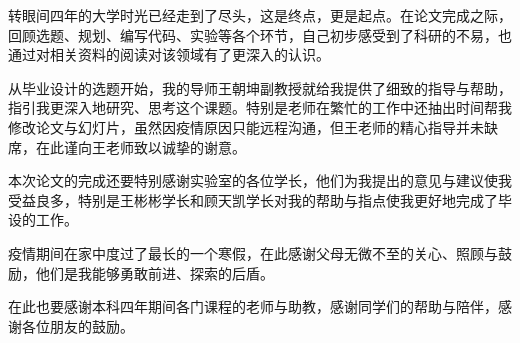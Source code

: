 
\begin{acknowledgements}
  转眼间四年的大学时光已经走到了尽头，这是终点，更是起点。在论文完成之际，回顾选题、规划、编写代码、实验等各个环节，自己初步感受到了科研的不易，也通过对相关资料的阅读对该领域有了更深入的认识。
  
  从毕业设计的选题开始，我的导师王朝坤副教授就给我提供了细致的指导与帮助，指引我更深入地研究、思考这个课题。特别是老师在繁忙的工作中还抽出时间帮我修改论文与幻灯片，虽然因疫情原因只能远程沟通，但王老师的精心指导并未缺席，在此谨向王老师致以诚挚的谢意。
  
  本次论文的完成还要特别感谢实验室的各位学长，他们为我提出的意见与建议使我受益良多，特别是王彬彬学长和顾天凯学长对我的帮助与指点使我更好地完成了毕设的工作。

  疫情期间在家中度过了最长的一个寒假，在此感谢父母无微不至的关心、照顾与鼓励，他们是我能够勇敢前进、探索的后盾。

  在此也要感谢本科四年期间各门课程的老师与助教，感谢同学们的帮助与陪伴，感谢各位朋友的鼓励。
\end{acknowledgements}
